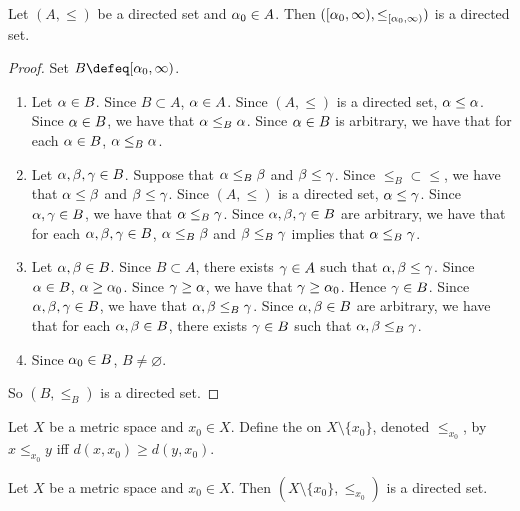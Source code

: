 \documentclass{book}
\begin{document}
	\begin{ex} 
		Let $(A, \leq)$ be a directed set and $\alpha_0 \in A$. Then $([\alpha_0, \infty), \leq_{[\alpha_0, \infty)})$ is a directed set. 
	\end{ex}

	\begin{proof} Set $B \defeq [\al_0, \infty)$.
		\begin{enumerate}
			\item Let $\alpha \in B$. Since $B \subset A$, $\alpha \in A$. Since $(A, \leq)$ is a directed set, $\alpha \leq \alpha$. Since $\alpha \in B$, we have that $\alpha \leq_B \alpha$. Since $\alpha \in B$ is arbitrary, we have that for each $\alpha \in B$, $\alpha \leq_B \alpha$. 
			\item Let $\alpha, \beta, \gamma \in B$. Suppose that $\alpha \leq_B \beta$ and $\beta \leq \gamma$. Since $\leq_B \subset \leq$, we have that $\alpha \leq \beta$ and $\beta \leq \gamma$. Since $(A, \leq)$ is a directed set, $\alpha \leq \gamma$. Since $\alpha, \gamma \in B$, we have that $\alpha \leq_B \gamma$. Since $\alpha, \beta, \gamma \in B$ are arbitrary, we have that for each $\alpha, \beta, \gamma \in B$, $\alpha \leq_B \beta$ and $\beta \leq_B \gamma$ implies that $\alpha \leq_B \gamma$.
			\item Let $\alpha, \beta \in B$. Since $B \subset A$, there exists $\gamma \in A$ such that $\alpha, \beta \leq \gamma$. Since $\alpha \in B$, $\alpha \geq \alpha_0$. Since $\gamma \geq \alpha$, we have that $\gamma \geq \alpha_0$. Hence $\gamma \in B$. Since $\alpha, \beta, \gamma \in B$, we have that $\alpha, \beta \leq_B \gamma$. Since $\alpha,\beta \in B$ are arbitrary, we have that for each $\alpha, \beta \in B$, there exists $\gamma \in B$ such that $\alpha, \beta \leq_B \gamma$.  
			\item Since $\alpha_0 \in B$, $B \neq \varnothing$.
		\end{enumerate}
		So $(B, \leq_B)$ is a directed set. 
	\end{proof}

	\begin{defn} 
		Let $X$ be a metric space and $x_0 \in X$. Define the  on $X \setminus \{x_0\}$, denoted $\leq_{x_0}$, by $x \leq_{x_0} y$ iff $d(x, x_0) \geq d(y, x_0)$.
	\end{defn}

	\begin{ex} 
		 Let $X$ be a metric space and $x_0 \in X$. Then $(X \setminus \{x_0\}, \leq_{x_0})$ is a directed set. 
	\end{ex}
\end{document}
